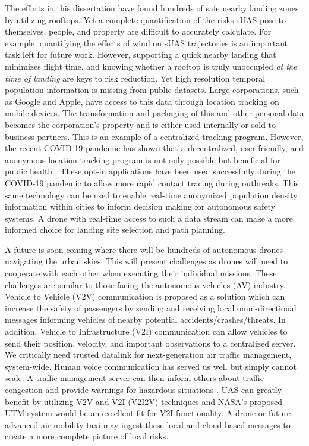 The efforts in this dissertation have found hundreds of safe nearby landing zones by utilizing rooftops. Yet a complete quantification of the risks \ac{sUAS} pose to themselves, people, and property are difficult to accurately calculate. For example, quantifying the effects of wind on \ac{sUAS} trajectories is an important task left for future work. However, supporting a quick nearby landing that minimizes flight time, and knowing whether a rooftop is truly unoccupied \emph{at the time of landing} are keys to risk reduction. Yet high resolution temporal population information is missing from public datasets. Large corporations, such as Google and Apple, have access to this data through location tracking on mobile devices. The transformation and packaging of this and other personal data becomes the corporation's property and is either used internally or sold to business partners. This is an example of a centralized tracking program. However, the recent COVID-19 pandemic has shown that a decentralized, user-friendly, and anonymous location tracking program is not only possible but beneficial for public health \cite{cohen_digital_2020, lee_benefits_2021}. These opt-in applications have been used successfully during the COVID-19 pandemic to allow more rapid contact tracing during outbreaks. This same technology can be used to enable real-time anonymized population density information within cities to inform decision making for autonomous safety systems. A drone with real-time access to such a data stream can make a more informed choice for landing site selection and path planning.

A future is soon coming where there will be hundreds of autonomous drones navigating the urban skies. This will present challenges as drones will need to cooperate with each other when executing their individual missions. These challenges are similar to those facing the autonomous vehicles (AV) industry. Vehicle to Vehicle (V2V) communication is proposed as a solution which can increase the safety of passengers by sending and receiving local omni-directional messages informing vehicles of nearby potential accidents/crashes/threats. In addition, Vehicle to Infrastructure (V2I) communication can allow vehicles to send their position, velocity, and important observations to a centralized server. We critically need trusted datalink for next-generation air traffic management, system-wide.  Human voice communication has served us well but simply cannot scale.  A traffic management server can then inform others about traffic congestion and provide warnings for hazardous situations \cite{chitanvis_collision_2019}. \ac{UAS} can greatly benefit by utilizing V2V and V2I (V2I2V) techniques and NASA's proposed \acf{UTM} system would be an excellent fit for V2I functionality. A drone or future advanced air mobility taxi may ingest these local and cloud-based messages to create a more complete picture of local risks. 




